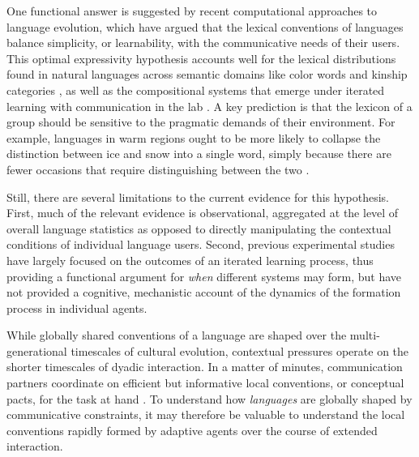 \documentclass[10pt,letterpaper]{article}
\begin{document}
One functional answer is suggested by recent computational approaches to language evolution, which have argued that the lexical conventions of languages balance simplicity, or learnability, with the communicative needs of their users. This optimal expressivity hypothesis accounts well for the lexical distributions found in natural languages across semantic domains like color words and kinship categories \cite{RegierKempKay15_WordMeaningsEfficientCommunication}, as well as the compositional systems that emerge under iterated learning with communication in the lab \cite{WintersKirbySmith14_LanguagesAdapt, KirbyTamarizCornishSmith15_CompressionCommunication}. A key prediction is that the lexicon of a group should be sensitive to the pragmatic demands of their environment. For example, languages in warm regions ought to be more likely to collapse the distinction between ice and snow into a single word, simply because there are fewer occasions that require distinguishing between the two \cite{RegierCarstensenKemp16_WordsForSnow}. 

Still, there are several limitations to the current evidence for this hypothesis. 
First, much of the relevant evidence is observational, aggregated at the level of overall language statistics as opposed to directly manipulating the contextual conditions of individual language users. 
Second, previous experimental studies have largely focused on the outcomes of an iterated learning process, thus providing a functional argument for \emph{when} different systems may form, but have not provided a cognitive, mechanistic account of the dynamics of the formation process in individual agents.

While globally shared conventions of a language are shaped over the multi-generational timescales of cultural evolution, contextual pressures operate on the shorter timescales of dyadic interaction. 
In a matter of minutes, communication partners coordinate on efficient but informative local conventions, or conceptual pacts, for the task at hand \cite{ClarkWilkesGibbs86_ReferringCollaborative, BrennanClark96_ConceptualPactsConversation,HawkinsFrankGoodman17_ConventionFormation}. 
To understand how \emph{languages} are globally shaped by communicative constraints, it may therefore be valuable to understand the local conventions rapidly formed by adaptive agents over the course of extended interaction.
\end{document}
